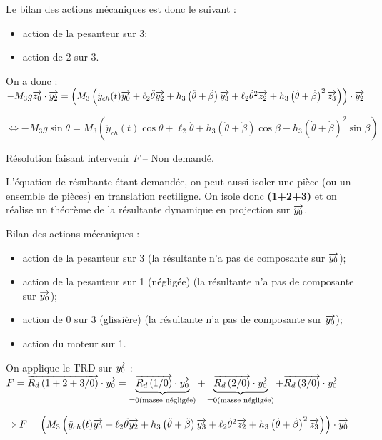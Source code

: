 \documentclass[10pt,fleqn]{article} %
\begin{document}
\begin{multicols}{2}
\begin{corrige}
Le bilan des actions mécaniques est donc le suivant : 
\begin{itemize}
\item action de la pesanteur sur 3;
\item action de 2 sur 3.
\end{itemize}

On a donc :
$-M_3 g \overrightarrow{z_0}\cdot \overrightarrow{y_2} = 
\left( M_3\left(\ddot{y}_{ch}(t) \overrightarrow{y_0}+\ell_2\ddot{\theta} \overrightarrow{y_2}+h_3\left(\ddot{\theta}+\ddot{\beta}\right) \overrightarrow{y_3}
+   
\ell_2\dot{\theta}^2 \overrightarrow{z_2}  +h_3\left(\dot{\theta}+\dot{\beta}\right)^2\overrightarrow{z_3}\right)\right) \cdot \overrightarrow{y_2}$

$ \Leftrightarrow -M_3 g \sin \theta  = 
 M_3\left(\ddot{y}_{ch}(t) \cos \theta +\ell_2\ddot{\theta} +h_3\left(\ddot{\theta}+\ddot{\beta}\right)\cos \beta 
-h_3\left(\dot{\theta}+\dot{\beta}\right)^2\sin\beta \right)$


\vspace{.6cm}
Résolution faisant intervenir $F$ -- Non demandé.

L'équation de résultante étant demandée, on peut aussi isoler une pièce (ou un ensemble de pièces) en translation rectiligne. On isole donc \textbf{(1+2+3)} et on réalise un théorème de la résultante dynamique en projection sur $\overrightarrow{y_0}$. 

Bilan des actions mécaniques : 
\begin{itemize}
\item action de la pesanteur sur 3 (la résultante n'a pas de composante sur $\overrightarrow{y_0}$);
\item action de la pesanteur sur 1 (négligée) (la résultante n'a pas de composante sur $\overrightarrow{y_0}$);
\item action de 0 sur 3 (glissière) (la résultante n'a pas de composante sur $\overrightarrow{y_0}$);
\item action du moteur sur 1.
\end{itemize}

On applique le TRD sur $\overrightarrow{y_0}$ :
$F = \overrightarrow{R_d \left( {1+2+3}/ {0}\right)}\cdot \overrightarrow{y_0}= \underbrace{\overrightarrow{R_d \left( {1}/ {0}\right)} \cdot  \overrightarrow{y_0}}_{=0 \text{(masse négligée)}}+ \underbrace{\overrightarrow{R_d \left( {2}/ {0}\right)}\cdot  \overrightarrow{y_0}}_{=0 \text{(masse négligée)}} + \overrightarrow{R_d \left( {3}/ {0}\right)}\cdot \overrightarrow{y_0}$

 $ \Rightarrow F = \left( M_3\left(\ddot{y}_{ch}(t) \overrightarrow{y_0}+\ell_2\ddot{\theta} \overrightarrow{y_2}+h_3\left(\ddot{\theta}+\ddot{\beta}\right) \overrightarrow{y_3}
+   
\ell_2\dot{\theta}^2 \overrightarrow{z_2}  +h_3\left(\dot{\theta}+\dot{\beta}\right)^2\overrightarrow{z_3}\right)\right) \cdot \overrightarrow{y_0}$


\end{corrige}
\end{multicols}
\end{document}
